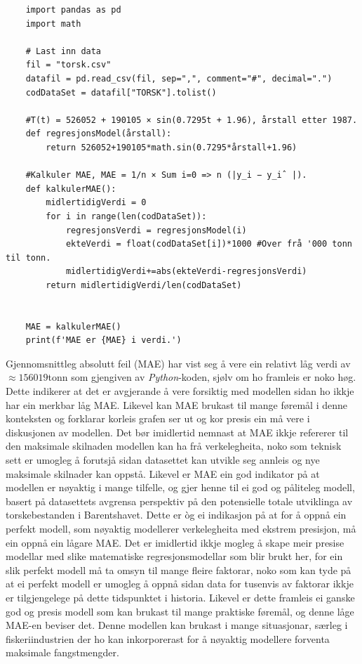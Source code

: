 \documentclass{report}
\begin{document}
\begin{verbatim}
    import pandas as pd
    import math

    # Last inn data
    fil = "torsk.csv"
    datafil = pd.read_csv(fil, sep=",", comment="#", decimal=".")
    codDataSet = datafil["TORSK"].tolist()

    #T(t) = 526052 + 190105 × sin(0.7295t + 1.96), årstall etter 1987.
    def regresjonsModel(årstall):
        return 526052+190105*math.sin(0.7295*årstall+1.96)

    #Kalkuler MAE, MAE = 1/n × Sum i=0 => n (|y_i − y_iˆ |).
    def kalkulerMAE():
        midlertidigVerdi = 0
        for i in range(len(codDataSet)):
            regresjonsVerdi = regresjonsModel(i)
            ekteVerdi = float(codDataSet[i])*1000 #Over frå '000 tonn til tonn.
            midlertidigVerdi+=abs(ekteVerdi-regresjonsVerdi)
        return midlertidigVerdi/len(codDataSet)


    MAE = kalkulerMAE()
    print(f'MAE er {MAE} i verdi.')
\end{verbatim}
Gjennomsnittleg absolutt feil (MAE) har vist seg å vere ein relativt låg verdi av $\approx 156019$tonn som gjengiven av \textit{Python}-koden, sjølv om ho framleis er noko høg. Dette indikerer at det er avgjerande å vere forsiktig med modellen sidan ho ikkje har ein merkbar låg MAE.
Likevel kan MAE brukast til mange føremål i denne konteksten og forklarar korleis grafen ser ut og kor presis ein må vere i diskusjonen av modellen.
Det bør imidlertid nemnast at MAE ikkje refererer til den maksimale skilnaden modellen kan ha frå verkelegheita, noko som teknisk sett er umogleg å forutsjå sidan datasettet kan utvikle seg annleis og nye maksimale skilnader kan oppstå.
Likevel er MAE ein god indikator på at modellen er nøyaktig i mange tilfelle, og gjer henne til ei god og påliteleg modell, basert på datasettets avgrensa perspektiv på den potensielle totale utviklinga av torskebestanden i Barentshavet.
Dette er òg ei indikasjon på at for å oppnå ein perfekt modell, som nøyaktig modellerer verkelegheita med ekstrem presisjon, må ein oppnå ein lågare MAE. Det er imidlertid ikkje mogleg å skape meir presise modellar med slike matematiske regresjonsmodellar som blir brukt her, for ein slik perfekt modell må ta omsyn til mange fleire faktorar, noko som kan tyde på at ei perfekt modell er umogleg å oppnå sidan data for tusenvis av faktorar ikkje er tilgjengelege på dette tidspunktet i historia.
Likevel er dette framleis ei ganske god og presis modell som kan brukast til mange praktiske føremål, og denne låge MAE-en beviser det. Denne modellen kan brukast i mange situasjonar, særleg i fiskeriindustrien der ho kan inkorporerast for å nøyaktig modellere forventa maksimale fangstmengder.
\end{document}
